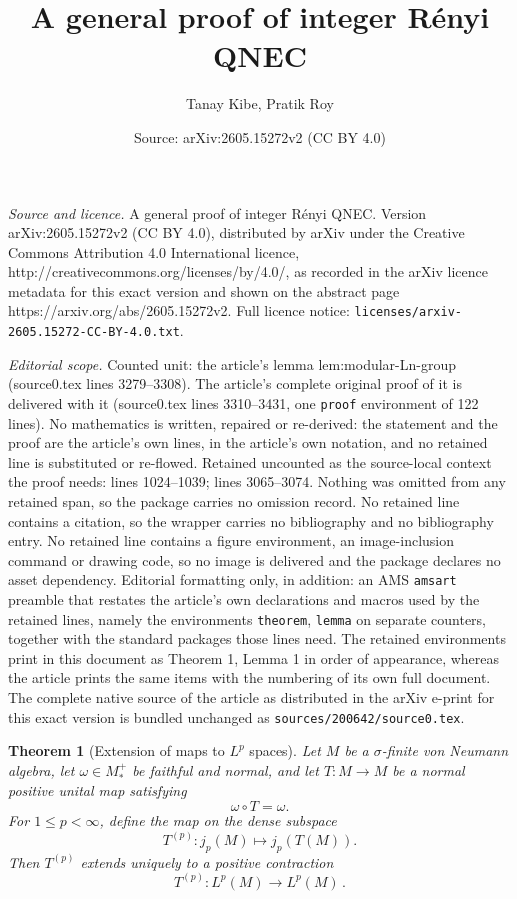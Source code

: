 \documentclass[10pt,a4paper]{amsart}
\title{A general proof of integer R\'{e}nyi QNEC}
\author{Tanay Kibe, Pratik Roy}
\date{Source: arXiv:2605.15272v2 (CC BY 4.0)}
\newtheorem{theorem}{Theorem}
\begin{document}
\maketitle

\noindent\emph{Source and licence.} A general proof of integer R\'{e}nyi QNEC. Version arXiv:2605.15272v2 (CC BY 4.0), distributed by arXiv under the Creative Commons Attribution 4.0 International licence, http://creativecommons.org/licenses/by/4.0/, as recorded in the arXiv licence metadata for this exact version and shown on the abstract page https://arxiv.org/abs/2605.15272v2. Full licence notice: \texttt{licenses/arxiv-2605.15272-CC-BY-4.0.txt}.\par\smallskip

\noindent\textit{Editorial scope.} Counted unit: the article's lemma lem:modular-Ln-group (source0.tex lines 3279--3308). The article's complete original proof of it is delivered with it (source0.tex lines 3310--3431, one \texttt{proof} environment of 122 lines). No mathematics is written, repaired or re-derived: the statement and the proof are the article's own lines, in the article's own notation, and no retained line is substituted or re-flowed.  Retained uncounted as the source-local context the proof needs: lines 1024--1039; lines 3065--3074.  Nothing was omitted from any retained span, so the package carries no omission record.  No retained line contains a citation, so the wrapper carries no bibliography and no bibliography entry.  No retained line contains a figure environment, an image-inclusion command or drawing code, so no image is delivered and the package declares no asset dependency.  Editorial formatting only, in addition: an AMS \texttt{amsart} preamble that restates the article's own declarations and macros used by the retained lines, namely the environments \texttt{theorem}, \texttt{lemma} on separate counters, together with the standard packages those lines need.  The retained environments print in this document as Theorem 1, Lemma 1 in order of appearance, whereas the article prints the same items with the numbering of its own full document.  The complete native source of the article as distributed in the arXiv e-print for this exact version is bundled unchanged as \texttt{sources/200642/source0.tex}.
\begin{theorem}[Extension of maps to $L^p$ spaces]\label{thm:extension-Lp}
Let \(M\) be a \(\sigma\)-finite von Neumann algebra, let
\(\omega\in M_*^+\) be faithful and normal, and let
\(T:M\to M\) be a normal positive unital map satisfying
\[
        \omega\circ T=\omega.
\]
For \(1\leq p<\infty\), define the map on the dense subspace
\[
    T^{(p)}: j_p(M)\longmapsto j_p(T(M)).
\]
Then $T^{(p)}$ extends uniquely to a positive contraction
\[
        T^{(p)}:L^p(M)\longrightarrow L^p(M)\,.
\]
\end{theorem}
\end{document}
